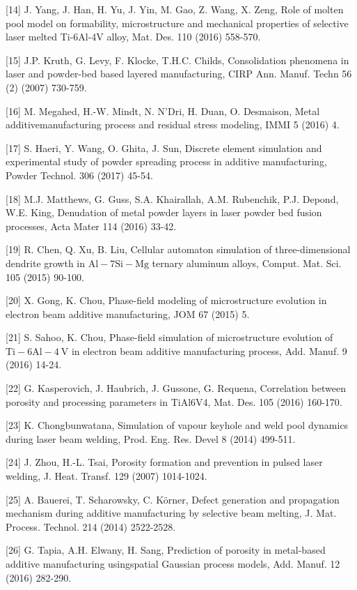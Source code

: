 \documentclass[10pt]{article}
\begin{document}
[14] J. Yang, J. Han, H. Yu, J. Yin, M. Gao, Z. Wang, X. Zeng, Role of molten pool model on formability, microstructure and mechanical properties of selective laser melted Ti-6Al-4V alloy, Mat. Des. 110 (2016) 558-570.

[15] J.P. Kruth, G. Levy, F. Klocke, T.H.C. Childs, Consolidation phenomena in laser and powder-bed based layered manufacturing, CIRP Ann. Manuf. Techn 56 (2) (2007) 730-759.

[16] M. Megahed, H.-W. Mindt, N. N'Dri, H. Duan, O. Desmaison, Metal additivemanufacturing process and residual stress modeling, IMMI 5 (2016) 4.

[17] S. Haeri, Y. Wang, O. Ghita, J. Sun, Discrete element simulation and experimental study of powder spreading process in additive manufacturing, Powder Technol. 306 (2017) 45-54.

[18] M.J. Matthews, G. Guss, S.A. Khairallah, A.M. Rubenchik, P.J. Depond, W.E. King, Denudation of metal powder layers in laser powder bed fusion processes, Acta Mater 114 (2016) 33-42.

[19] R. Chen, Q. Xu, B. Liu, Cellular automaton simulation of three-dimensional dendrite growth in $\mathrm{Al}-7 \mathrm{Si}-\mathrm{Mg}$ ternary aluminum alloys, Comput. Mat. Sci. 105 (2015) 90-100.

[20] X. Gong, K. Chou, Phase-field modeling of microstructure evolution in electron beam additive manufacturing, JOM 67 (2015) 5.

[21] S. Sahoo, K. Chou, Phase-field simulation of microstructure evolution of $\mathrm{Ti}-6 \mathrm{Al}-4 \mathrm{~V}$ in electron beam additive manufacturing process, Add. Manuf. 9 (2016) 14-24.

[22] G. Kasperovich, J. Haubrich, J. Gussone, G. Requena, Correlation between porosity and processing parameters in TiAl6V4, Mat. Des. 105 (2016) 160-170.

[23] K. Chongbunwatana, Simulation of vapour keyhole and weld pool dynamics during laser beam welding, Prod. Eng. Res. Devel 8 (2014) 499-511.

[24] J. Zhou, H.-L. Tsai, Porosity formation and prevention in pulsed laser welding, J. Heat. Transf. 129 (2007) 1014-1024.

[25] A. Bauerei, T. Scharowsky, C. Körner, Defect generation and propagation mechanism during additive manufacturing by selective beam melting, J. Mat. Process. Technol. 214 (2014) 2522-2528.

[26] G. Tapia, A.H. Elwany, H. Sang, Prediction of porosity in metal-based additive manufacturing usingspatial Gaussian process models, Add. Manuf. 12 (2016) 282-290.
\end{document}
